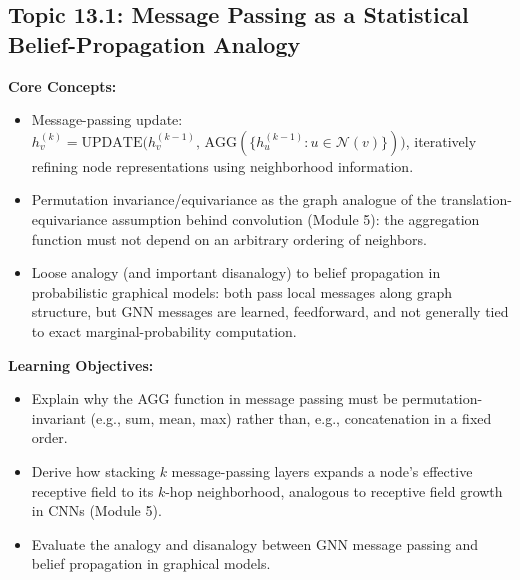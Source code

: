 \documentclass[11pt]{article}
\begin{document}
\subsection{Topic 13.1: Message Passing as a Statistical Belief-Propagation Analogy}

\textbf{Core Concepts:}
\begin{itemize}
  \item Message-passing update: $h_v^{(k)} = \text{UPDATE}\big(h_v^{(k-1)},\, \text{AGG}(\{h_u^{(k-1)} : u \in \mathcal N(v)\})\big)$, iteratively refining node representations using neighborhood information.
  \item Permutation invariance/equivariance as the graph analogue of the translation-equivariance assumption behind convolution (Module 5): the aggregation function must not depend on an arbitrary ordering of neighbors.
  \item Loose analogy (and important disanalogy) to belief propagation in probabilistic graphical models: both pass local messages along graph structure, but GNN messages are learned, feedforward, and not generally tied to exact marginal-probability computation.
\end{itemize}

\textbf{Learning Objectives:}
\begin{itemize}
  \item Explain why the AGG function in message passing must be permutation-invariant (e.g., sum, mean, max) rather than, e.g., concatenation in a fixed order.
  \item Derive how stacking $k$ message-passing layers expands a node's effective receptive field to its $k$-hop neighborhood, analogous to receptive field growth in CNNs (Module 5).
  \item Evaluate the analogy and disanalogy between GNN message passing and belief propagation in graphical models.
\end{itemize}
\end{document}
